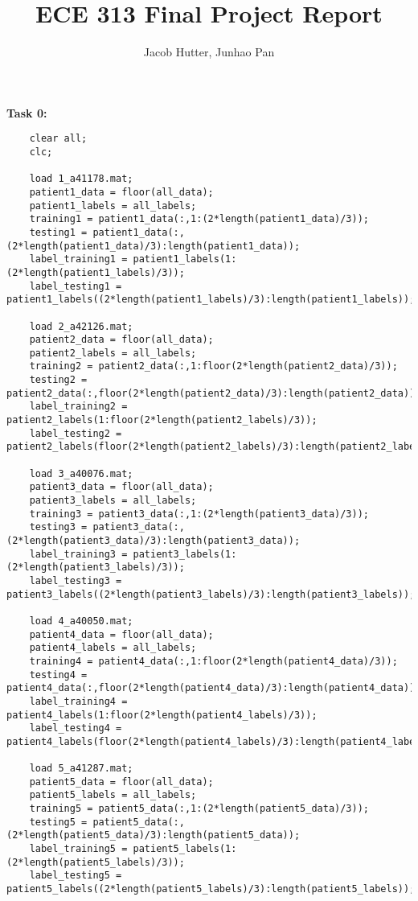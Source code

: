 \documentclass{article}
\author{Jacob Hutter, Junhao Pan}
\title{ECE 313 Final Project Report}
\begin{document}
\maketitle


\textbf{Task 0:}
\begin{lstlisting}
    clear all;
    clc;

    load 1_a41178.mat;
    patient1_data = floor(all_data);
    patient1_labels = all_labels;
    training1 = patient1_data(:,1:(2*length(patient1_data)/3));
    testing1 = patient1_data(:,(2*length(patient1_data)/3):length(patient1_data));
    label_training1 = patient1_labels(1:(2*length(patient1_labels)/3));
    label_testing1 = patient1_labels((2*length(patient1_labels)/3):length(patient1_labels));

    load 2_a42126.mat;
    patient2_data = floor(all_data);
    patient2_labels = all_labels;
    training2 = patient2_data(:,1:floor(2*length(patient2_data)/3));
    testing2 = patient2_data(:,floor(2*length(patient2_data)/3):length(patient2_data));
    label_training2 = patient2_labels(1:floor(2*length(patient2_labels)/3));
    label_testing2 = patient2_labels(floor(2*length(patient2_labels)/3):length(patient2_labels));

    load 3_a40076.mat;
    patient3_data = floor(all_data);
    patient3_labels = all_labels;
    training3 = patient3_data(:,1:(2*length(patient3_data)/3));
    testing3 = patient3_data(:,(2*length(patient3_data)/3):length(patient3_data));
    label_training3 = patient3_labels(1:(2*length(patient3_labels)/3));
    label_testing3 = patient3_labels((2*length(patient3_labels)/3):length(patient3_labels));

    load 4_a40050.mat;
    patient4_data = floor(all_data);
    patient4_labels = all_labels;
    training4 = patient4_data(:,1:floor(2*length(patient4_data)/3));
    testing4 = patient4_data(:,floor(2*length(patient4_data)/3):length(patient4_data));
    label_training4 = patient4_labels(1:floor(2*length(patient4_labels)/3));
    label_testing4 = patient4_labels(floor(2*length(patient4_labels)/3):length(patient4_labels));

    load 5_a41287.mat;
    patient5_data = floor(all_data);
    patient5_labels = all_labels;
    training5 = patient5_data(:,1:(2*length(patient5_data)/3));
    testing5 = patient5_data(:,(2*length(patient5_data)/3):length(patient5_data));
    label_training5 = patient5_labels(1:(2*length(patient5_labels)/3));
    label_testing5 = patient5_labels((2*length(patient5_labels)/3):length(patient5_labels));


\end{lstlisting}
\end{document}
